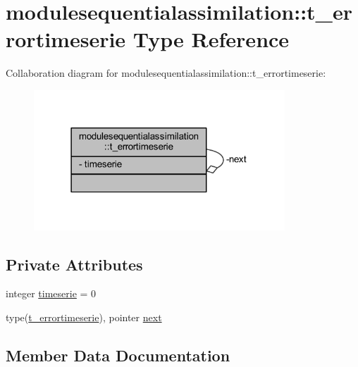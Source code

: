 \hypertarget{structmodulesequentialassimilation_1_1t__errortimeserie}{}\section{modulesequentialassimilation\+:\+:t\+\_\+errortimeserie Type Reference}
\label{structmodulesequentialassimilation_1_1t__errortimeserie}


Collaboration diagram for modulesequentialassimilation\+:\+:t\+\_\+errortimeserie\+:\nopagebreak
\begin{figure}[H]
\begin{center}
\leavevmode
\includegraphics[width=267pt]{structmodulesequentialassimilation_1_1t__errortimeserie__coll__graph}
\end{center}
\end{figure}
\subsection*{Private Attributes}
\begin{DoxyCompactItemize}
\item 
integer \mbox{\hyperlink{structmodulesequentialassimilation_1_1t__errortimeserie_a2029ac2435807535a58bed6dec3c0683}{timeserie}} = 0
\item 
type(\mbox{\hyperlink{structmodulesequentialassimilation_1_1t__errortimeserie}{t\+\_\+errortimeserie}}), pointer \mbox{\hyperlink{structmodulesequentialassimilation_1_1t__errortimeserie_a0f1d542daf74748bd1698f251f860590}{next}}
\end{DoxyCompactItemize}


\subsection{Member Data Documentation}
\mbox{\label{structmodulesequentialassimilation_1_1t__errortimeserie_a0f1d542daf74748bd1698f251f860590}} 
